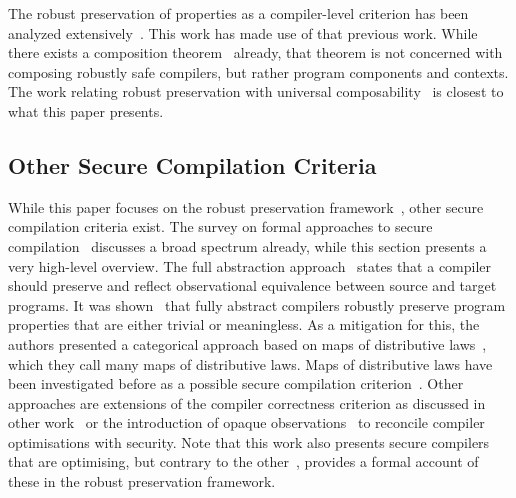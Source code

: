 \documentclass[utf8,acmsmall,review,screen,dvipsnames,anonymous]{acmart}
\begin{document}
The robust preservation of properties as a compiler-level criterion has been analyzed extensively~\cite{abate2019jour,patrignani2021rsc,abate2021extacc,patrignani2022universal,patrignani2019survey}.
This work has made use of that previous work.
While there exists a composition theorem~\cite{abate2019jour} already, that theorem is not concerned with composing robustly safe compilers, but rather program components and contexts.
The work relating robust preservation with universal composability~\cite{patrignani2022universal} is closest to what this paper presents.

\subsection{Other Secure Compilation Criteria}\label{subsec:relw:seccompcrit}

While this paper focuses on the robust preservation framework~\cite{abate2019jour}, other secure compilation criteria exist.
The survey on formal approaches to secure compilation~\cite{patrignani2019survey} discusses a broad spectrum already, while this section presents a very high-level overview.
The full abstraction approach~\cite{abadi1999fullabstraction} states that a compiler should preserve and reflect observational equivalence between source and target programs.
It was shown~\cite{abate2021faandrc} that fully abstract compilers robustly preserve program properties that are either trivial or meaningless.
As a mitigation for this, the authors presented a categorical approach based on maps of distributive laws~\cite{watanabe2002modl}, which they call many maps of distributive laws.
Maps of distributive laws have been investigated before as a possible secure compilation criterion~\cite{tsampas2020catsc}.
Other approaches are extensions of the compiler correctness criterion as discussed in other work~\cite{patterson2019next700} or the introduction of opaque observations~\cite{vu2021reconciling} to reconcile compiler optimisations with security.
Note that this work also presents secure compilers that are optimising, but contrary to the other~\cite{vu2021reconciling}, provides a formal account of these in the robust preservation framework.
\end{document}
